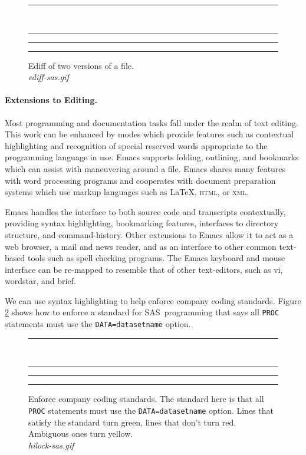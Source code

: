 \documentclass{article}
\newcommand*{\SAS}{\textsc{SAS}}
\newcommand{\stexttt}[1]{{\small\texttt{#1}}}
\newcommand{\emptyfig}{
\hspace*{42pt}\rule{324pt}{.25pt}\\
\hspace*{42pt}\rule{.25pt}{10pc}
\rule{316pt}{.25pt}
\rule{.25pt}{10pc}}
\begin{document}
\begin{figure}
\emptyfig
\caption[place holder for a long caption]{Ediff of two versions of a file.\\
{\it ediff-sas.gif}
\label{f.ediff}}
\end{figure}





\paragraph{Extensions to Editing.}
Most programming and documentation tasks fall under the realm of text
editing.  This work can be enhanced by modes which provide features
such as contextual highlighting and recognition of special reserved
words appropriate to the programming language in use.  Emacs supports
folding, outlining, and bookmarks which can assist with maneuvering
around a file.  Emacs shares many features with word processing
programs and cooperates with document preparation systems which use
markup languages such as \LaTeX, \textsc{html}, or \textsc{xml}.


Emacs handles the interface to both source code and transcripts
contextually, providing syntax highlighting, bookmarking features,
interfaces to directory structure, and command-history.  Other
extensions to Emacs allow it to act as a web browser, a
mail and news reader, and as an interface to other common text-based
tools such as spell checking programs.  The Emacs keyboard and mouse
interface can be re-mapped to resemble that of other text-editors,
such as vi, wordstar, and brief.

We can use syntax highlighting to help enforce company coding
standards.  Figure \ref{f.hilock} shows how to enforce a standard for
\SAS\ programming that says all \stexttt{PROC} statements must use the
\stexttt{DATA=datasetname} option.

\begin{figure}
\emptyfig
\caption[place holder for a long caption]{Enforce company coding
standards.  The standard here is that all \stexttt{PROC} statements must use
the \stexttt{DATA=datasetname} option.  Lines that satisfy the standard
turn green, lines that don't turn red.  Ambiguous ones turn yellow.\\
{\it hilock-sas.gif}
\label{f.hilock}}
\end{figure}
\end{document}

